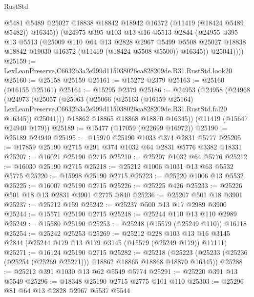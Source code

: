 \begin{lexlean}{RustStd}
\begin{coremodule}
              @5481
              @5489
              @25027
              @18838
              @18842
              @18942
              @16372
              (@11419 (@18424 @5489 @5482))
              @16345))
          (@24975
            @395
            @103
            @13
            @16
            @5513
            @2844
            (@24955
              @395
              @13
              @5513
              (@25009
                @110
                @64
                @13
                @2828
                @2967
                @5499
                @5508
                @25027
                @18838
                @18842
                @19030
                @16372
                (@11419 (@18424 @5508 @5500))
                @16345))
            @25041))))
@25159 := LexLeanPreserve.C6632b3a2e999d115038026ca828209de.R31.RustStd.look20
@25160 := @25158 @25159
@25161 := @15272 @2379
@25163 := @25160 (@16155 @25161)
@25164 := @15295 @2379
@25186 := @24953
    (@24958
      (@24968
        (@24973
          (@25057
            (@25063
              (@25066
                (@25163
                  (@16159 @25164)
                  LexLeanPreserve.C6632b3a2e999d115038026ca828209de.R31.RustStd.fal20
                  @16345))
              @25041)))
        @18862
        @18865
        @18868
        @18870
        @16345))
    (@11419 (@15647 @24940 @179))
@25189 := @15477 (@17059 (@22699 @16972))
@25190 := @25189 @24940
@25195 := @15970 @25190 @1033 @374 @2831 @5777
@25205 := @17859 @25190 @2715 @291 @374 @1032 @64 @2831 @5776 @3382 @18331
@25207 := @16021 @25190 @2715
@25210 := @25207 @1032 @64 @5776
@25212 := @16030 @25190 @2715
@25218 := @25212 @1006 @1031 @13 @63 @5532 @5775
@25220 := @15998 @25190 @2715
@25223 := @25220 @1006 @13 @5532
@25225 := @16007 @25190 @2715
@25226 := @25225 @426
@25233 := @25226 @501 @18 @13 @2831 @3901 @2775 @840
@25236 := @25207 @501 @18 @3901
@25237 := @25212 @159
@25242 := @25237 @500 @13 @17 @2989 @3900
@25244 := @15571 @25190 @2715
@25248 := @25244 @110 @13 @110 @2989
@25249 := @15580 @25190
@25253 := @25248 (@15579 (@25249 @110)) @16118
@25254 := @25242 @25253
@25269 := @25212
    @228
    @103
    @13
    @16
    @3145
    @2844
    (@25244 @179 @13 @179 @3145 (@15579 (@25249 @179)) @17111)
@25271 := @16124 @25190 @2715
@25282 := @25218
    (@25223 (@25233 (@25236 (@25254 (@25269 @25271))) @18862 @18865 @18868 @18870 @16345))
@25288 := @25212 @391 @1030 @13 @62 @5549 @5774
@25291 := @25220 @391 @13 @5549
@25296 := @18348 @25190 @2715 @2775 @101 @110
@25303 := @25296 @81 @64 @13 @2828 @2967 @5537 @5544

\end{coremodule}
\end{lexlean}
